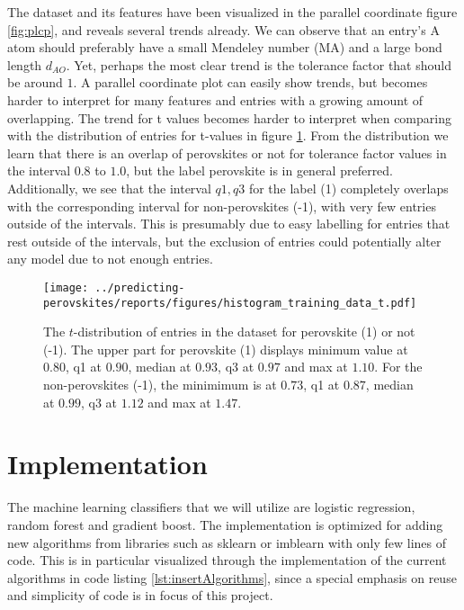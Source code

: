 \noindent The dataset and its features have been visualized in the parallel coordinate \cite{Inselberg1985} figure \ref{fig:plcp}, and reveals several trends already. We can observe that an entry's A atom should preferably have a small Mendeley number (MA) and a large bond length $d_{AO}$. Yet, perhaps the most clear trend is the tolerance factor that should be around $1$. A parallel coordinate plot can easily show trends, but becomes harder to interpret for many features and entries with a growing amount of overlapping. The trend for t values becomes harder to interpret when comparing with the distribution of entries for t-values in figure \ref{fig:hist_perov_t}. From the distribution we learn that there is an overlap of perovskites or not for tolerance factor values in the interval $0.8$ to $1.0$, but the label perovskite is in general preferred. Additionally, we see that the interval ${q1,q3}$ for the label (1) completely overlaps with the corresponding interval for non-perovskites (-1), with very few entries outside of the intervals. This is presumably due to easy labelling for entries that rest outside of the intervals, but the exclusion of entries could potentially alter any model due to not enough entries. %

\begin{figure}[ht!]
  \centering
  \texttt{[image: ../predicting-perovskites/reports/figures/histogram\_training\_data\_t.pdf]}
  \vspace*{-130mm}
  \caption{The $t$-distribution of entries in the dataset for perovskite (1) or not (-1). The upper part for perovskite (1) displays minimum value at $0.80$, q1 at $0.90$, median at $0.93$, q3 at $0.97$ and max at $1.10$. For the non-perovskites (-1), the minimimum is at $0.73$, q1 at $0.87$, median at $0.99$, q3 at $1.12$ and max at $1.47$.}
  \label{fig:hist_perov_t}
\end{figure}

\section{Implementation}

The machine learning classifiers that we will utilize are logistic regression, random forest and gradient boost. The implementation is optimized for adding new algorithms from libraries such as sklearn \cite{Pedregosa2012} or imblearn \cite{Lemaitre2016} with only few lines of code. This is in particular visualized through the implementation of the current algorithms in code listing \ref{lst:insertAlgorithms}, since a special emphasis on reuse and simplicity of code is in focus of this project.

